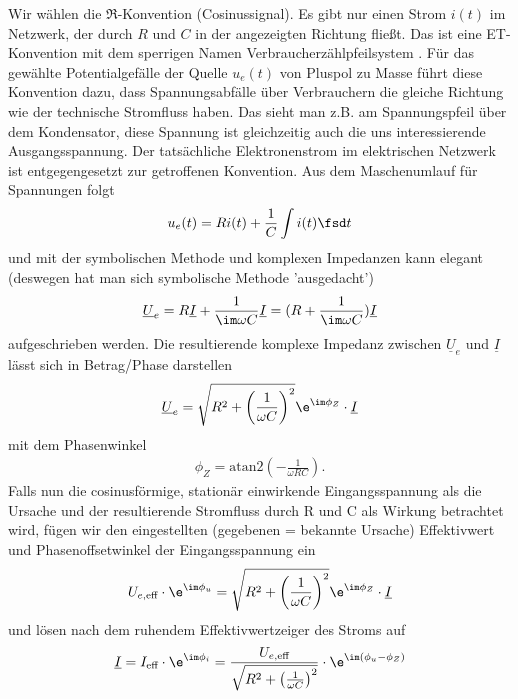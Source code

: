 Wir wählen die $\Re$-Konvention (Cosinussignal).
%
Es gibt nur einen Strom $i(t)$ im Netzwerk, der durch $R$ und $C$ in der angezeigten
Richtung fließt. Das ist eine ET-Konvention mit dem sperrigen Namen
Verbraucherzählpfeilsystem \cite[S. 7]{Marinescu2020}. Für das gewählte Potentialgefälle
der Quelle $u_e(t)$ von Pluspol zu Masse führt diese Konvention dazu, dass
Spannungsabfälle über Verbrauchern die gleiche Richtung wie der technische
Stromfluss haben. Das sieht man z.B. am Spannungspfeil über dem Kondensator,
diese Spannung ist gleichzeitig auch die uns interessierende Ausgangsspannung.
%
Der tatsächliche Elektronenstrom im elektrischen Netzwerk ist entgegengesetzt
zur getroffenen Konvention.
%
Aus dem Maschenumlauf \cite[Kap. 2.5]{Marinescu2020} für Spannungen folgt
\begin{align}
\label{eq:appb:mascheRC}
u_e(t) = R i(t) +  \frac{1}{C} \int i(t) \fsd t
\end{align}
und mit der symbolischen Methode und komplexen Impedanzen kann elegant (deswegen hat man sich symbolische Methode 'ausgedacht')
\begin{align}
\underline{U}_e = R \underline{I} +  \frac{1}{\im \omega C} \underline{I}
= (R +  \frac{1}{\im \omega C}) \underline{I}
\end{align}
aufgeschrieben werden.
%
Die resultierende komplexe Impedanz zwischen $\underline{U}_e$ und $\underline{I}$
lässt sich in Betrag/Phase darstellen
\begin{align}
\underline{U}_e = \sqrt{R^2 +  \left(\frac{1}{\omega C}\right)^2} \e^{\im \phi_Z} \cdot \underline{I}
\end{align}
mit dem Phasenwinkel
\begin{align}
\phi_Z = \text{atan2}({-\frac{1}{\omega R C}}).
\end{align}
Falls nun die cosinusförmige, stationär einwirkende Eingangsspannung als die
Ursache und der resultierende Stromfluss durch R und C als
Wirkung betrachtet wird, fügen wir den eingestellten (gegebenen = bekannte Ursache)
Effektivwert und Phasenoffsetwinkel der Eingangsspannung ein
\begin{align}
U_{e,\text{eff}} \cdot \e^{\im \phi_u} = \sqrt{R^2 +  \left(\frac{1}{\omega C}\right)^2} \e^{\im \phi_Z} \cdot \underline{I}
\end{align}
und lösen nach dem ruhendem Effektivwertzeiger des Stroms auf
\begin{align}
\underline{I} =
I_\text{eff} \cdot \e^{\im \phi_i} =
\frac{U_{e,\text{eff}}}{\sqrt{R^2 +  \left(\frac{1}{\omega C}\right)^2}}
\cdot \e^{\im (\phi_u-\phi_Z)}
\end{align}
